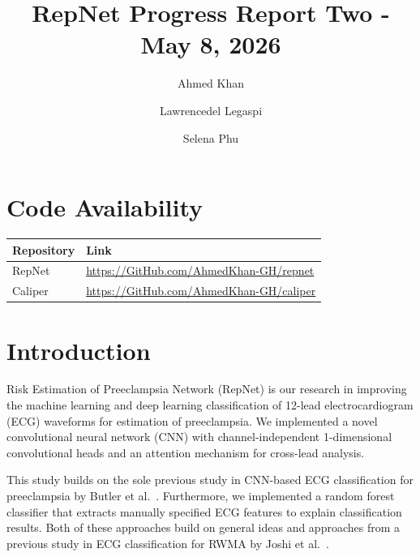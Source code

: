 \documentclass[sigconf,nonacm]{acmart}
\begin{document}
\title{RepNet Progress Report Two - May 8, 2026}

\author{Ahmed Khan}

\author{Lawrencedel Legaspi}

\author{Selena Phu}

\maketitle

{%
\renewcommand{\contentsname}{Table of Contents}
\setcounter{tocdepth}{2}
}

\section*{Code Availability}
\begin{center}
\begin{tabular}{@{}ll@{}}
\toprule
\textbf{Repository} & \textbf{Link} \\
\midrule
RepNet & \url{https://GitHub.com/AhmedKhan-GH/repnet} \\
Caliper & \url{https://GitHub.com/AhmedKhan-GH/caliper} \\
\bottomrule
\end{tabular}
\end{center}

\section{Introduction}
Risk Estimation of Preeclampsia Network (RepNet) is our research in improving the machine learning and deep learning classification of 12-lead electrocardiogram (ECG) waveforms for estimation of preeclampsia. We implemented a novel convolutional neural network (CNN) with channel-independent 1-dimensional convolutional heads and an attention mechanism for cross-lead analysis.

This study builds on the sole previous study in CNN-based ECG classification for preeclampsia by Butler et al.~\cite{butler_ai-based_2024}. Furthermore, we implemented a random forest classifier that extracts manually specified ECG features to explain classification results. Both of these approaches build on general ideas and approaches from a previous study in ECG classification for RWMA by Joshi et al.~\cite{joshi_linking_2025}.
\end{document}
